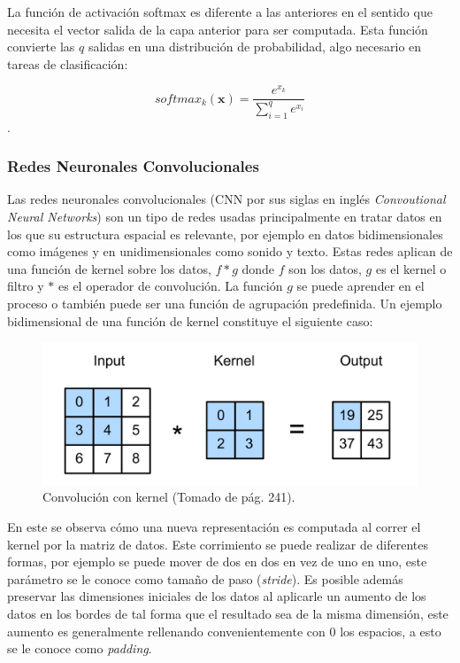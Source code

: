 La función de activación softmax es diferente a las anteriores en el sentido que necesita
el vector salida de la capa anterior para ser computada. Esta función convierte las $q$ salidas
en una distribución de probabilidad, algo necesario en tareas de clasificación:

\begin{equation}
	softmax_k(\textbf{x}) = \frac{e^{x_k}}{\sum\limits_{i=1}^{q} e^{x_i}}
\end{equation}\label{eq:softmax}.

\subsubsection{Redes Neuronales Convolucionales}

Las redes neuronales convolucionales (CNN por sus siglas en inglés \emph{Convoutional Neural Networks}) 
son un tipo de redes usadas
principalmente en tratar datos en los que su estructura espacial es relevante, por ejemplo
en datos bidimensionales como imágenes y en unidimensionales como sonido y texto.
Estas redes aplican de una función de kernel sobre los datos, $f * g$ donde $f$ son los
datos, $g$ es el kernel o filtro y $*$ es el operador de convolución. La función $g$ se puede 
aprender en el proceso o también puede ser una función de agrupación predefinida. 
Un ejemplo bidimensional de una función de kernel constituye el siguiente caso:

\begin{figure}[h!]
	\begin{center}
		\begin{center}
			\includegraphics[scale=.3]{Graphics/kernel_convolution.png}
        \end{center}
	    \caption{Convolución con kernel (Tomado de \cite{d2l} pág. 241).}\label{fig:conv_kernel}
	\end{center}
\end{figure}

En este se observa cómo una nueva representación es computada al correr el kernel por la matriz de datos. Este
corrimiento se puede realizar de diferentes formas, por ejemplo se puede mover de dos en dos en vez de uno en uno, este
parámetro se le conoce como tamaño de paso (\emph{stride}). Es posible además preservar las dimensiones
iniciales de los datos al aplicarle un aumento de los datos en los bordes de tal forma que el resultado sea de la misma
dimensión, este aumento es generalmente rellenando convenientemente con 0 los espacios, a esto se le conoce como 
\emph{padding}.

